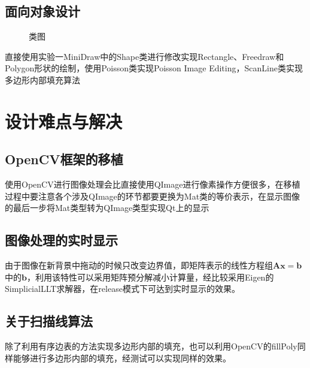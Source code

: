 \documentclass[14pt]{scrartcl} %
\begin{document}
	
	\pagebreak
	\subsection{面向对象设计}
	
	\begin{figure}[h] %
		\centering
		\caption{类图}
	\end{figure}
	
	直接使用实验一MiniDraw中的Shape类进行修改实现Rectangle、Freedraw和Polygon形状的绘制，使用Poisson类实现Poisson Image Editing，ScanLine类实现多边形内部填充算法
	
	\pagebreak
	\section{设计难点与解决}
	
	\subsection{OpenCV框架的移植}
	
	使用OpenCV进行图像处理会比直接使用QImage进行像素操作方便很多，在移植过程中要注意各个涉及QImage的环节都要更换为Mat类的等价表示，在显示图像的最后一步将Mat类型转为QImage类型实现Qt上的显示
	
	\subsection{图像处理的实时显示}
	
	由于图像在新背景中拖动的时候只改变边界值，即矩阵表示的线性方程组$\boldsymbol A \boldsymbol x=\boldsymbol b$中的$\boldsymbol b$，利用该特性可以采用矩阵预分解减小计算量，经比较采用Eigen的SimplicialLLT求解器，在release模式下可达到实时显示的效果。 
	
	\subsection{关于扫描线算法}
	
	除了利用有序边表的方法实现多边形内部的填充，也可以利用OpenCV的fillPoly同样能够进行多边形内部的填充，经测试可以实现同样的效果。
	
	
	
\end{document}
